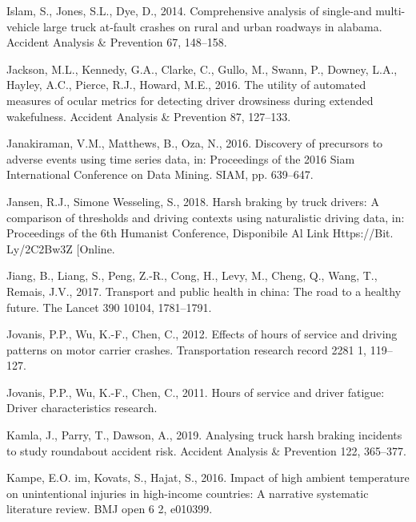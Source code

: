 \documentclass[12pt]{book}
\numberwithin{equation}{chapter}
\begin{document}
\leavevmode\hypertarget{ref-islam2014comprehensive}{}%
Islam, S., Jones, S.L., Dye, D., 2014. Comprehensive analysis of single-and multi-vehicle large truck at-fault crashes on rural and urban roadways in alabama. Accident Analysis \& Prevention 67, 148--158.

\leavevmode\hypertarget{ref-jackson2016utility}{}%
Jackson, M.L., Kennedy, G.A., Clarke, C., Gullo, M., Swann, P., Downey, L.A., Hayley, A.C., Pierce, R.J., Howard, M.E., 2016. The utility of automated measures of ocular metrics for detecting driver drowsiness during extended wakefulness. Accident Analysis \& Prevention 87, 127--133.

\leavevmode\hypertarget{ref-janakiraman2016discovery}{}%
Janakiraman, V.M., Matthews, B., Oza, N., 2016. Discovery of precursors to adverse events using time series data, in: Proceedings of the 2016 Siam International Conference on Data Mining. SIAM, pp. 639--647.

\leavevmode\hypertarget{ref-jansen2018harsh}{}%
Jansen, R.J., Simone Wesseling, S., 2018. Harsh braking by truck drivers: A comparison of thresholds and driving contexts using naturalistic driving data, in: Proceedings of the 6th Humanist Conference, Disponibile Al Link Https://Bit. Ly/2C2Bw3Z {[}Online.

\leavevmode\hypertarget{ref-jiang2017transport}{}%
Jiang, B., Liang, S., Peng, Z.-R., Cong, H., Levy, M., Cheng, Q., Wang, T., Remais, J.V., 2017. Transport and public health in china: The road to a healthy future. The Lancet 390 10104, 1781--1791.

\leavevmode\hypertarget{ref-jovanis2012effects}{}%
Jovanis, P.P., Wu, K.-F., Chen, C., 2012. Effects of hours of service and driving patterns on motor carrier crashes. Transportation research record 2281 1, 119--127.

\leavevmode\hypertarget{ref-jovanis2011hours}{}%
Jovanis, P.P., Wu, K.-F., Chen, C., 2011. Hours of service and driver fatigue: Driver characteristics research.

\leavevmode\hypertarget{ref-kamla2019analysing}{}%
Kamla, J., Parry, T., Dawson, A., 2019. Analysing truck harsh braking incidents to study roundabout accident risk. Accident Analysis \& Prevention 122, 365--377.

\leavevmode\hypertarget{ref-im2016impact}{}%
Kampe, E.O. im, Kovats, S., Hajat, S., 2016. Impact of high ambient temperature on unintentional injuries in high-income countries: A narrative systematic literature review. BMJ open 6 2, e010399.
\end{document}

